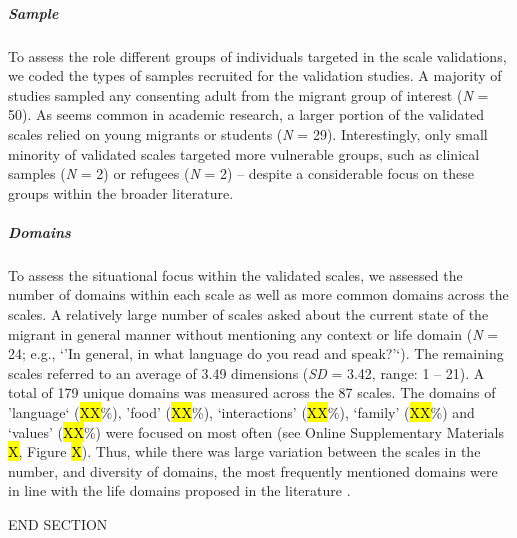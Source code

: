 \subparagraph{Sample}

To assess the role different groups of individuals targeted in the scale
validations, we coded the types of samples recruited for the validation
studies. A majority of studies sampled any consenting adult from the
migrant group of interest (\textit{N} = 50). As seems common in academic
research, a larger portion of the validated scales relied on young
migrants or students (\textit{N} = 29). Interestingly, only small
minority of validated scales targeted more vulnerable groups, such as
clinical samples (\textit{N} = 2) or refugees (\textit{N} = 2) --
despite a considerable focus on these groups within the broader
literature.

\subparagraph{Domains}

To assess the situational focus within the validated scales, we assessed
the number of domains within each scale as well as more common domains
across the scales. A relatively large number of scales asked about the
current state of the migrant in general manner without mentioning any
context or life domain (\textit{N} = 24; e.g., `'In general, in what
language do you read and speak?'`). The remaining scales referred to an
average of 3.49 dimensions (\textit{SD} = 3.42, range: 1 -- 21). A total
of 179 unique domains was measured across the 87 scales. The domains of
'language` (\hl{XX}\%), 'food' (\hl{XX}\%), `interactions' (\hl{XX}\%),
`family' (\hl{XX}\%) and `values' (\hl{XX}\%) were focused on most often
(see Online Supplementary Materials \hl{X}, Figure \hl{X}). Thus, while
there was large variation between the scales in the number, and
diversity of domains, the most frequently mentioned domains were in line
with the life domains proposed in the literature
\citep[e.g.,][]{Arends-Toth2007}.

\vspace{1em}

END SECTION
